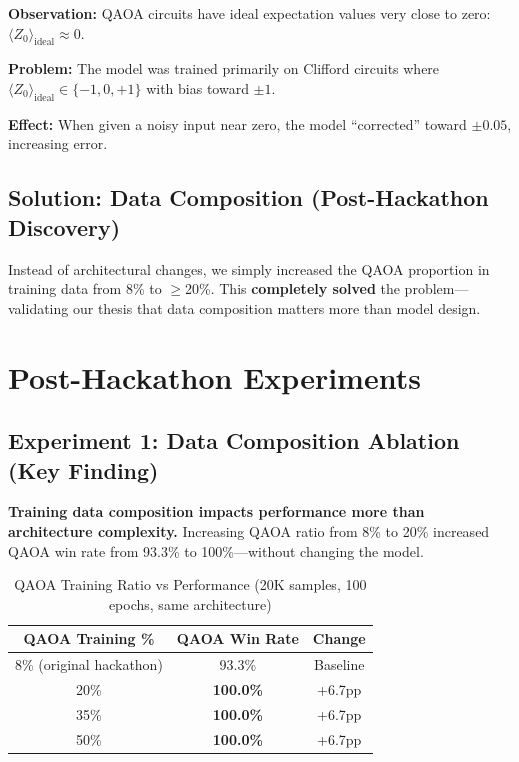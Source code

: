 \documentclass[11pt, a4paper]{article}
\begin{document}
\textbf{Observation:} QAOA circuits have ideal expectation values very close
to zero: $\langle Z_0 \rangle_{\text{ideal}} \approx 0$.

\textbf{Problem:} The model was trained primarily on Clifford circuits where
$\langle Z_0 \rangle_{\text{ideal}} \in \{-1, 0, +1\}$ with bias toward
$\pm 1$.

\textbf{Effect:} When given a noisy input near zero, the model ``corrected''
toward $\pm 0.05$, increasing error.

\subsection{Solution: Data Composition (Post-Hackathon Discovery)}

Instead of architectural changes, we simply increased the QAOA proportion
in training data from 8\% to $\geq$20\%. This \textbf{completely solved}
the problem---validating our thesis that data composition matters more
than model design.

\section{Post-Hackathon Experiments}
\label{sec:post_hackathon}

\subsection{Experiment 1: Data Composition Ablation (Key Finding)}

\begin{keyinsight}
\textbf{Training data composition impacts performance more than architecture
complexity.} Increasing QAOA ratio from 8\% to 20\% increased QAOA win rate
from 93.3\% to 100\%---without changing the model.
\end{keyinsight}

\begin{table}[H]
\centering
\caption{QAOA Training Ratio vs Performance (20K samples, 100 epochs, same architecture)}
\label{tab:data_comp}
\begin{tabular}{@{}ccc@{}}
\toprule
\textbf{QAOA Training \%} & \textbf{QAOA Win Rate} & \textbf{Change} \\ \midrule
8\% (original hackathon) & 93.3\% & Baseline \\
20\% & \textbf{100.0\%} & +6.7pp \\
35\% & \textbf{100.0\%} & +6.7pp \\
50\% & \textbf{100.0\%} & +6.7pp \\
\bottomrule
\end{tabular}
\end{table}
\end{document}
